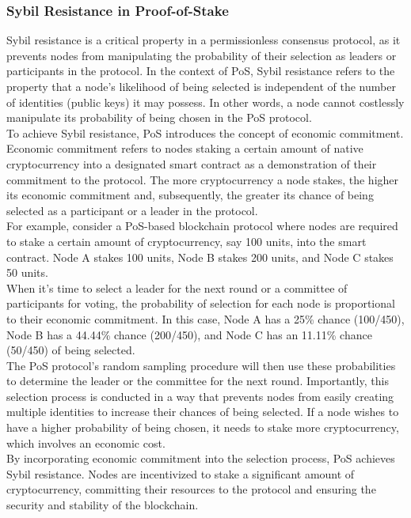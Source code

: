 \subsubsection{Sybil Resistance in Proof-of-Stake}
Sybil resistance is a critical property in a permissionless consensus protocol, as it prevents nodes from manipulating the probability of their selection as leaders or participants in the protocol. In the context of PoS, Sybil resistance refers to the property that a node's likelihood of being selected is independent of the number of identities (public keys) it may possess. In other words, a node cannot costlessly manipulate its probability of being chosen in the PoS protocol.\\
To achieve Sybil resistance, PoS introduces the concept of economic commitment. Economic commitment refers to nodes staking a certain amount of native cryptocurrency into a designated smart contract as a demonstration of their commitment to the protocol. The more cryptocurrency a node stakes, the higher its economic commitment and, subsequently, the greater its chance of being selected as a participant or a leader in the protocol.\\
For example, consider a PoS-based blockchain protocol where nodes are required to stake a certain amount of cryptocurrency, say 100 units, into the smart contract. Node A stakes 100 units, Node B stakes 200 units, and Node C stakes 50 units.\\
When it's time to select a leader for the next round or a committee of participants for voting, the probability of selection for each node is proportional to their economic commitment. In this case, Node A has a 25\% chance (100/450), Node B has a 44.44\% chance (200/450), and Node C has an 11.11\% chance (50/450) of being selected.\\
The PoS protocol's random sampling procedure will then use these probabilities to determine the leader or the committee for the next round. Importantly, this selection process is conducted in a way that prevents nodes from easily creating multiple identities to increase their chances of being selected. If a node wishes to have a higher probability of being chosen, it needs to stake more cryptocurrency, which involves an economic cost.\\
By incorporating economic commitment into the selection process, PoS achieves Sybil resistance. Nodes are incentivized to stake a significant amount of cryptocurrency, committing their resources to the protocol and ensuring the security and stability of the blockchain.\\
